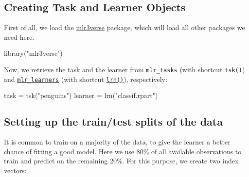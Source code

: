 \documentclass[
]{scrbook}
\newenvironment{Shaded}{\begin{snugshade}}{\end{snugshade}}
\newcommand{\FloatTok}[1]{\textcolor[rgb]{0.00,0.00,0.81}{#1}}
\newcommand{\FunctionTok}[1]{\textcolor[rgb]{0.00,0.00,0.00}{#1}}
\newcommand{\NormalTok}[1]{#1}
\newcommand{\OtherTok}[1]{\textcolor[rgb]{0.56,0.35,0.01}{#1}}
\newcommand{\SpecialCharTok}[1]{\textcolor[rgb]{0.00,0.00,0.00}{#1}}
\newcommand{\StringTok}[1]{\textcolor[rgb]{0.31,0.60,0.02}{#1}}
\renewenvironment{Shaded} {\begin{snugshade}\small} {\end{snugshade}}
\begin{document}
\hypertarget{train-predict-objects}{%
\subsection{Creating Task and Learner Objects}\label{train-predict-objects}}

First of all, we load the \href{https://mlr3verse.mlr-org.com}{mlr3verse} package, which will load all other packages we need here.

\begin{Shaded}
\begin{Highlighting}[]
\FunctionTok{library}\NormalTok{(}\StringTok{"mlr3verse"}\NormalTok{)}
\end{Highlighting}
\end{Shaded}

Now, we retrieve the task and the learner from \href{https://mlr3.mlr-org.com/reference/mlr_tasks.html}{\texttt{mlr\_tasks}} (with shortcut \href{https://mlr3.mlr-org.com/reference/mlr_sugar.html}{\texttt{tsk()}}) and \href{https://mlr3.mlr-org.com/reference/mlr_learners.html}{\texttt{mlr\_learners}} (with shortcut \href{https://mlr3.mlr-org.com/reference/mlr_sugar.html}{\texttt{lrn()}}), respectively:

\begin{Shaded}
\begin{Highlighting}[]
\NormalTok{task }\OtherTok{=} \FunctionTok{tsk}\NormalTok{(}\StringTok{"penguins"}\NormalTok{)}
\NormalTok{learner }\OtherTok{=} \FunctionTok{lrn}\NormalTok{(}\StringTok{"classif.rpart"}\NormalTok{)}
\end{Highlighting}
\end{Shaded}

\hypertarget{split-data}{%
\subsection{Setting up the train/test splits of the data}\label{split-data}}

It is common to train on a majority of the data, to give the learner a better chance of fitting a good model.
Here we use 80\% of all available observations to train and predict on the remaining 20\%.
For this purpose, we create two index vectors:

\begin{Shaded}
\end{Shaded}
\end{document}
